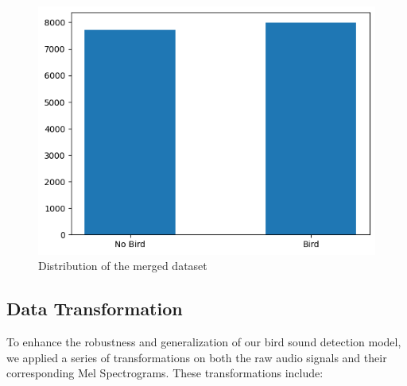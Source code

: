       \begin{figure}[h!]
            \centering
            \includegraphics[scale=0.75]{images/dataset_detection-3.png}
            \caption{Distribution of the merged dataset}
            \label{fig:merged_dataset}
      \end{figure}         \newpage      

      \subsection{Data Transformation}
      To enhance the robustness and generalization of our bird sound detection model, we applied a series of transformations on both the raw audio signals and 
      their corresponding Mel Spectrograms. These transformations include:

